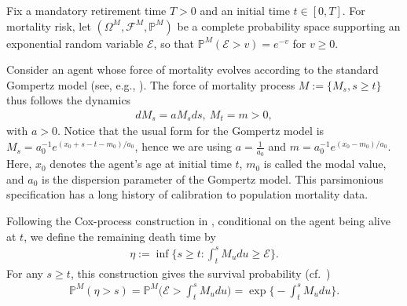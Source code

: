 \documentclass[a4paper,11pt]{amsart}
\numberwithin{equation}{section}
\begin{document}
\leavevmode
{
Fix a mandatory retirement time $T>0$ and an initial time $t\in[0,T]$. For mortality risk, let $({\Omega}^M,{\mathcal{F}^M},{\mathbb{P}^M})$ be a complete probability space supporting an exponential random variable $\mathcal{E}$, so that $\mathbb{P}^M(\mathcal{E}>v)=e^{-v}$ for $v\geq0$. 
}

 Consider an agent whose force of mortality evolves according to the standard Gompertz model (see, e.g., \citet{gompertz1825nature}). The force of mortality process $M:=\{M_s, s\geq t\}$ thus follows the dynamics
 \begin{align}\label{2-1}
d M_s = aM_s ds ,  \ M_t =m>0,
\end{align}
with $a>0$. Notice that the usual form for the Gompertz model is $M_s=a_0^{-1}e^{(x_0+s-t-m_0)/{a_0}}$, hence we are using $a=\frac{1}{a_0}$ and $m=a_0^{-1}e^{(x_0-m_0)/{a_0}}$. Here, $x_0$ denotes the agent's age at initial time $t$, $m_0$ is called the modal value, and $a_0$ is the dispersion parameter of the Gompertz model. This parsimonious specification has a long history of calibration to population mortality data. 


{
Following the Cox-process construction in \citet[Chapter 2.3.1]{aksamit2017enlargement}, conditional on the agent being alive at $t$, we define the remaining death time by
\begin{align*}
\eta:=\inf\bigg\{s\geq t:\int_t^s M_u du\geq\mathcal{E}\bigg\}.
\end{align*}
For any $s\geq t$, this construction gives the survival probability (cf.\ \citet[Chapter 2.3.2, Lemma 2.25, p. 42]{aksamit2017enlargement})
\begin{align*}
\mathbb{P}^M(\eta>s)=\mathbb{P}^M\bigg(\mathcal{E}>\int_t^sM_u du\bigg)=\exp\bigg\{-\int_t^sM_u du\bigg\}.
\end{align*} 
}

\end{document}

